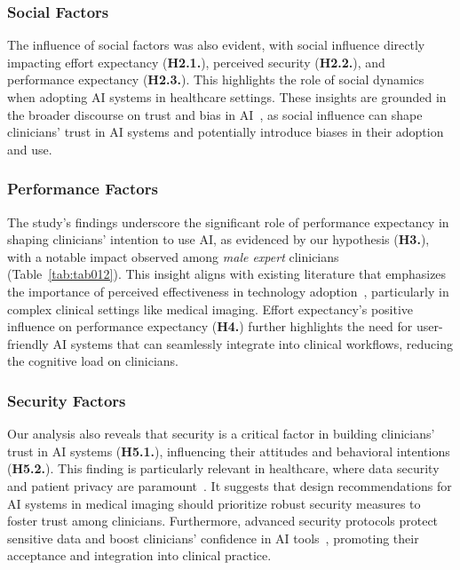\subsubsection{Social Factors}
\label{sec:chap004006001002}

\textcolor{revised}{The influence of social factors was also evident, with social influence directly impacting effort expectancy ({\bf H2.1.}), perceived security ({\bf H2.2.}), and performance expectancy ({\bf H2.3.}).
This highlights the role of social dynamics when adopting \ac{AI} systems in healthcare settings.
These insights are grounded in the broader discourse on trust and bias in \ac{AI}~\cite{CHOUDHURY2022103708}, as social influence can shape clinicians' trust in \ac{AI} systems and potentially introduce biases in their adoption and use.}

\subsubsection{Performance Factors}
\label{sec:chap004006001003}

\textcolor{revised}{The study's findings underscore the significant role of performance expectancy in shaping clinicians' intention to use \ac{AI}, as evidenced by our hypothesis ({\bf H3.}), with a notable impact observed among {\it male expert} clinicians (Table~\ref{tab:tab012}).
This insight aligns with existing literature that emphasizes the importance of perceived effectiveness in technology adoption~\cite{SOLAIMANI2023101760, HSIEH2023107868}, particularly in complex clinical settings like medical imaging.
Effort expectancy's positive influence on performance expectancy ({\bf H4.}) further highlights the need for user-friendly \ac{AI} systems that can seamlessly integrate into clinical workflows, reducing the cognitive load on clinicians.}

\subsubsection{Security Factors}
\label{sec:chap004006001004}

\textcolor{revised}{Our analysis also reveals that security is a critical factor in building clinicians' trust in \ac{AI} systems ({\bf H5.1.}), influencing their attitudes and behavioral intentions ({\bf H5.2.}).
This finding is particularly relevant in healthcare, where data security and patient privacy are paramount~\cite{6038874, HLAVKA2020235}.
It suggests that design recommendations for \ac{AI} systems in medical imaging should prioritize robust security measures to foster trust among clinicians.
Furthermore, advanced security protocols protect sensitive data and boost clinicians' confidence in \ac{AI} tools~\cite{KHANIJAHANI2022100602}, promoting their acceptance and integration into clinical practice.}

